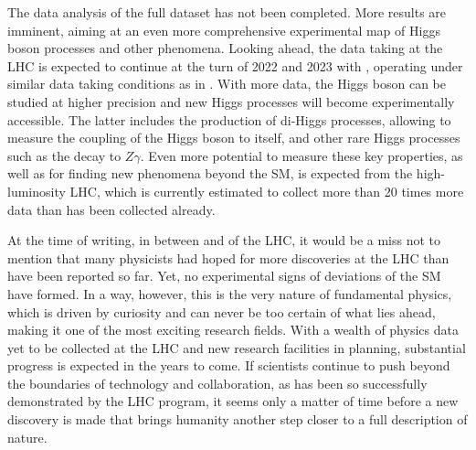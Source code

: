The data analysis of the full \RunTwo dataset has not been completed. 
More results are imminent, aiming at an even more comprehensive experimental map of Higgs boson processes and other phenomena. 
Looking ahead, the data taking at the LHC is expected to continue at the turn of 2022 and 2023 with \RunThr, operating under similar data taking conditions as in \RunTwo. 
With more data, the Higgs boson can be studied at higher precision and new Higgs processes will become experimentally accessible. The latter includes the production of di-Higgs processes, allowing to measure the coupling of the Higgs boson to itself, and other rare Higgs processes such as the decay to $Z\gamma$. 
Even more potential to measure these key properties, as well as for finding new phenomena beyond the SM, is expected from the high-luminosity LHC, which is currently estimated to collect more than 20 times more data than has been collected already. 


At the time of writing, in between \RunTwo and \RunThr of the LHC, it would be a miss not to mention that many physicists had hoped for more discoveries at the LHC than have been reported so far. 
Yet, no experimental signs of deviations of the SM have formed.
In a way, however, this is the very nature of fundamental physics, which is driven by curiosity and can never be too certain of what lies ahead, making it one of the most exciting research fields. 
With a wealth of physics data yet to be collected at the LHC and new research facilities in planning, substantial progress is expected in the years to come. If scientists continue to push beyond the boundaries of technology and collaboration, as has been so successfully demonstrated by the LHC program, it seems only a matter of time before a new discovery is made that brings humanity another step closer to a full description of nature. 

